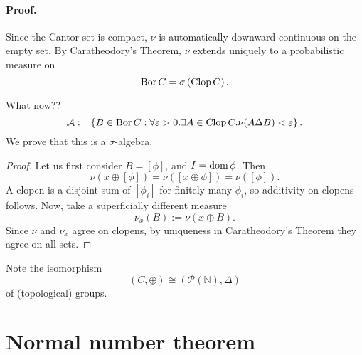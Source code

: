 \paragraph{Proof.} Since the Cantor set is compact, \( \nu \) is automatically downward continuous on the empty set. By Caratheodory's Theorem, \( \nu \) extends uniquely to a probabilistic measure on 
\[ 
    \operatorname{Bor} C = \sigma \left( \operatorname{Clop} C \right).
\]

What now??
\[ 
    \mathcal{A} := \left\{ B \in \operatorname{Bor} C : \forall\varepsilon > 0. \exists A \in \operatorname{Clop} C. \nu (A \Delta B) <\varepsilon \right\}.
\]
We prove that this is a \( \sigma \)-algebra.

\begin{proof}
    Let us first consider \( B = \left [ \phi \right ] \), and \( I = \operatorname{dom} \phi \). Then
    \[ 
       \nu \left( x \oplus \left[ \phi \right] \right) = \nu \left( \left[ x \oplus \phi \right] \right) = \nu \left( \left[ \phi \right] \right).
   \]
   A clopen is a disjoint sum of \( \left[ \phi_i \right] \) for finitely many \( \phi_i \), so additivity on clopens follows. Now, take a superficially different measure
   \[ 
      \nu_x(B) := \nu \left( x \oplus B \right). 
  \]
  Since \( \nu \) and \( \nu_x \) agree on clopens, by uniqueness in Caratheodory's Theorem they agree on all sets.
\end{proof}

Note the isomorphism
\[ 
    (C, \oplus) \cong ( \mathcal{P}( \mathbb{N} ), \Delta ) 
\]
of (topological) groups.

\section{Normal number theorem}


